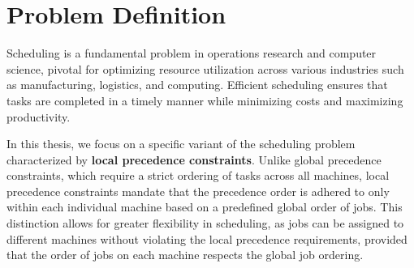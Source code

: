 \chapter{Problem Definition} \label{chap:problem_definition}

Scheduling is a fundamental problem in operations research and computer science, pivotal for optimizing resource utilization across various industries such as manufacturing, logistics, and computing. Efficient scheduling ensures that tasks are completed in a timely manner while minimizing costs and maximizing productivity.

In this thesis, we focus on a specific variant of the scheduling problem characterized by \textbf{local precedence constraints}. Unlike global precedence constraints, which require a strict ordering of tasks across all machines, local precedence constraints mandate that the precedence order is adhered to only within each individual machine based on a predefined global order of jobs. This distinction allows for greater flexibility in scheduling, as jobs can be assigned to different machines without violating the local precedence requirements, provided that the order of jobs on each machine respects the global job ordering.




